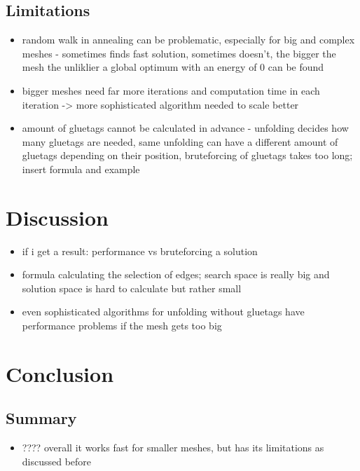 \documentclass[draft,final]{vutinfth} %
\begin{document}
\section{Limitations}

\begin{itemize}
	\item random walk in annealing can be problematic, especially for big and complex meshes - sometimes finds fast solution, sometimes doesn't, the bigger the mesh the unliklier a global optimum with an energy of 0 can be found
	\item bigger meshes need far more iterations and computation time in each iteration -> more sophisticated algorithm needed to scale better
	\item amount of gluetags cannot be calculated in advance - unfolding decides how many gluetags are needed, same unfolding can have a different amount of gluetags depending on their position, bruteforcing of gluetags takes too long; insert formula and example
\end{itemize}

\chapter{Discussion}

\begin{itemize}
	\item if i get a result: performance vs bruteforcing a solution
	\item formula calculating the selection of edges; search space is really big and solution space is hard to calculate but rather small
	\item even sophisticated algorithms for unfolding without gluetags have performance problems if the mesh gets too big
\end{itemize}

\chapter{Conclusion}

\section{Summary}

\begin{itemize}
	\item ???? overall it works fast for smaller meshes, but has its limitations as discussed before
\end{itemize}
\end{document}
